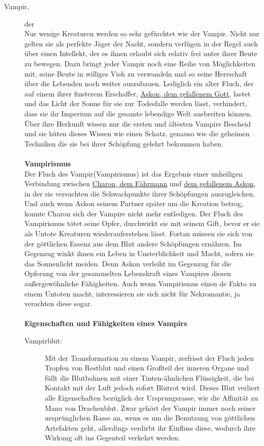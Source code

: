 \documentclass[a4paper,12pt,oneside]{book}
\begin{document}
\begin{description}
\item[Vampir,] der\label{Vampir}
\\Nur wenige Kreaturen werden so sehr gefürchtet wie der Vampir. Nicht nur gelten sie als perfekte Jäger der Nacht, sondern verfügen in der Regel auch über einen Intellekt, der es ihnen erlaubt sich relativ frei unter ihrer Beute zu bewegen. Dazu bringt jeder Vampir noch eine Reihe von Möglichkeiten mit, seine Beute in williges Vieh zu verwandeln und so seine Herrschaft über die Lebenden noch weiter auszubauen. Lediglich ein alter Fluch, der auf einem ihrer finsterem Erschaffer, \uline{\hyperref[Askon]{Askon, dem gefallenem Gott}}, lastet und das Licht der Sonne für sie zur Todesfalle werden lässt, verhindert, dass sie ihr Imperium auf die gesamte lebendige Welt ausbreiten können. Über ihre Herkunft wissen nur die ersten und ältesten Vampire Bescheid und sie hüten dieses Wissen wie einen Schatz, genauso wie die geheimen Techniken die sie bei ihrer Schöpfung gelehrt bekommen haben.
\\\\\textbf{Vampirismus}
\\Der Fluch des Vampir(Vampirismus) ist das Ergebnis einer unheiligen Verbindung zwischen \uline{\hyperref[Charon]{Charon, dem Fährmann}} und \uline{\hyperref[Askon]{dem gefallenem Askon}}, in der sie versuchten die Schwachpunkte ihrer Schöpfungen auszugleichen. Und auch wenn Askon seinem Partner später um die Kreation betrog, konnte Charon sich der Vampire nicht mehr entledigen. Der Fluch des Vampirismus tötet seine Opfer, durchwirkt sie mit seinem Gift, bevor er sie als Untote Kreaturen wiederauferstehen lässt. Fortan müssen sie sich von der göttlichen Essenz aus dem Blut andere Schöpfungen ernähren. Im Gegenzug winkt ihnen ein Leben in Unsterblichkeit und Macht, sofern sie das Sonnenlicht meiden. Denn Askon verleiht im Gegenzug für die Opferung von der gesammelten Lebenskraft eines Vampires diesen außergewöhnliche Fähigkeiten. Auch wenn Vampirismus einen de Fakto zu einem Untoten macht, interessieren sie sich nicht für Nekromantie, ja verachten diese sogar. 
\\\\\textbf{Eigenschaften und Fähigkeiten eines Vampirs}\\
\begin{description}
\item[Vampirblut:]
Mit der Transformation zu einem Vampir, zerfrisst der Fluch jeden Tropfen von Restblut und einen Großteil der inneren Organe und füllt die Blutbahnen mit einer Tinten-ähnlichen Flüssigkeit, die bei Kontakt mit der Luft jedoch sofort Blutrot wird. Dieses Blut verliert alle Eigenschaften bezüglich der Ursprungsrasse, wie die Affinität zu Mana von Drachenblut. Zwar gehört der Vampir immer noch seiner ursprünglichen Rasse an, wenn es um die Benutzung von göttlichen Artefakten geht, allerdings verdirbt ihr Einfluss diese, wodurch ihre Wirkung oft ins Gegenteil verkehrt werden.

\end{description}
\end{description}
\end{document}
